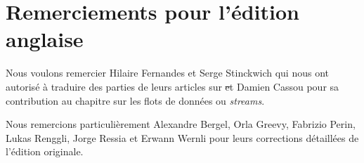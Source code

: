 \documentclass[a4paper,10pt,twoside]{book}
\begin{document}







\section*{Remerciements pour l'édition anglaise}


Nous voulons remercier Hilaire Fernandes et Serge Stinckwich qui nous
ont autorisé à traduire des parties de leurs articles sur \st et
Damien Cassou pour sa contribution au chapitre sur les flots de
données ou \emph{streams}.

Nous remercions particulièrement Alexandre Bergel, Orla Greevy,
Fabrizio Perin, Lukas Renggli, Jorge Ressia et Erwann Wernli pour leurs
corrections détaillées %
de l'édition originale. %
\end{document}
